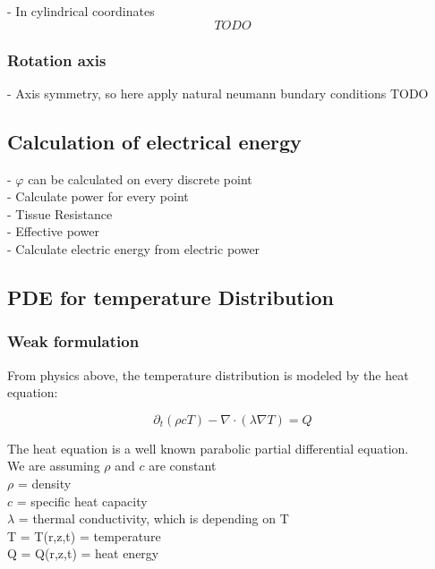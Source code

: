 \documentclass[parskip=half, titlepage=yes, 12pt, BCOR=12mm, DIV=calc]{scrartcl}
\begin{document}
- In cylindrical coordinates
\begin{equation}
    TODO
\end{equation}

\subsubsection{Rotation axis}

- Axis symmetry, so here apply natural neumann bundary conditions TODO \\


\subsection{Calculation of electrical energy}

- $\varphi$ can be calculated on every discrete point \\
- Calculate power for every point \\
- Tissue Resistance \\
- Effective power \\
- Calculate electric energy from electric power \\




\subsection{PDE for temperature Distribution}

\subsubsection{Weak formulation}

From physics above, the temperature distribution is modeled by the heat equation: 

\begin{equation}
    \partial_t (\rho c T) - \nabla \cdot (\lambda \nabla T) = Q
\end{equation}

The heat equation is a well known parabolic partial differential equation. \\

We are assuming $\rho$ and $c$ are constant \\
$\rho$ = density \\
$c$ = specific heat capacity \\
$\lambda$ = thermal conductivity, which is depending on T \\
T = T(r,z,t) = temperature \\
Q = Q(r,z,t) = heat energy \\
\end{document}
